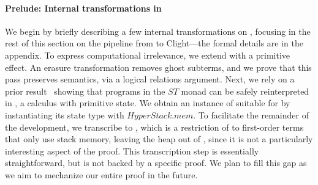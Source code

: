 \paragraph*{Prelude: Internal transformations in \emf}
We begin by briefly describing a few internal transformations on \emf,
focusing in the rest of this section on the pipeline from \lamstar to
Clight---the formal details are in the appendix. To express
computational irrelevance, we extend \emf with a primitive 
effect. An erasure transformation removes ghost subterms, and we prove
that this pass preserves semantics, via a logical relations
argument. Next, we rely on a prior result~\cite{dm4free} showing
that \emf programs in the \lst$ST$ monad can be safely reinterpreted
in \emfST, a calculus with primitive state. We obtain an instance
of \emfST suitable for \lowstar by instantiating its state type
with \lst$HyperStack.mem$. To facilitate the remainder of the
development, we transcribe \emfST to \lamstar, which is a restriction
of \emfST to first-order terms that only use stack memory, leaving the
heap out of \lamstar, since it is not a particularly interesting
aspect of the proof. This transcription step is essentially
straightforward, but is not backed by a specific proof. We plan to
fill this gap as we aim to mechanize our entire proof in the future.







